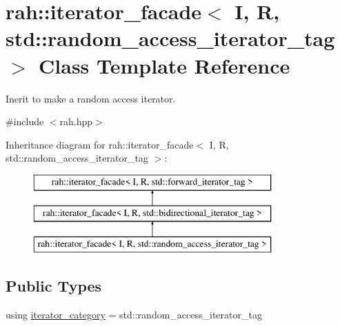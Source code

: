 \hypertarget{structrah_1_1iterator__facade_3_01_i_00_01_r_00_01std_1_1random__access__iterator__tag_01_4}{}\section{rah\+::iterator\+\_\+facade$<$ I, R, std\+::random\+\_\+access\+\_\+iterator\+\_\+tag $>$ Class Template Reference}
\label{structrah_1_1iterator__facade_3_01_i_00_01_r_00_01std_1_1random__access__iterator__tag_01_4}


Inerit to make a random access iterator.  




{\ttfamily \#include $<$rah.\+hpp$>$}

Inheritance diagram for rah\+::iterator\+\_\+facade$<$ I, R, std\+::random\+\_\+access\+\_\+iterator\+\_\+tag $>$\+:\begin{figure}[H]
\begin{center}
\leavevmode
\includegraphics[height=3.000000cm]{structrah_1_1iterator__facade_3_01_i_00_01_r_00_01std_1_1random__access__iterator__tag_01_4}
\end{center}
\end{figure}
\subsection*{Public Types}
\begin{DoxyCompactItemize}
\item 
using \mbox{\hyperlink{structrah_1_1iterator__facade_3_01_i_00_01_r_00_01std_1_1random__access__iterator__tag_01_4_a90e8ca56b8c64c3342bcfbc722931cc5}{iterator\+\_\+category}} = std\+::random\+\_\+access\+\_\+iterator\+\_\+tag
\end{DoxyCompactItemize}
